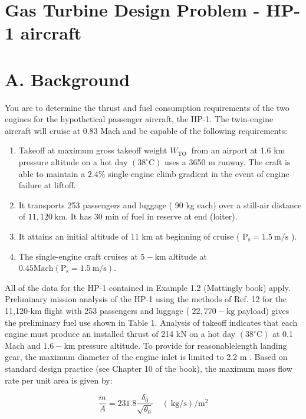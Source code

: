 \documentclass[10pt]{article}
\begin{document}
\section*{Gas Turbine Design Problem - HP-1 aircraft}
\section*{A. Background}
You are to determine the thrust and fuel consumption requirements of the two engines for the hypothetical passenger aircraft, the HP-1. The twin-engine aircraft will cruise at 0.83 Mach and be capable of the following requirements:

\begin{enumerate}
  \item Takeoff at maximum gross takeoff weight $W_{\text {TO }}$ from an airport at 1.6 km pressure altitude on a hot day $\left(38^{\circ} \mathrm{C}\right)$ uses a 3650 m runway. The craft is able to maintain a $2.4 \%$ single-engine climb gradient in the event of engine failure at liftoff.
  \item It transports 253 passengers and luggage ( 90 kg each) over a still-air distance of $11,120 \mathrm{~km}$. It has 30 min of fuel in reserve at end (loiter).
  \item It attains an initial altitude of 11 km at beginning of cruise ( $\mathrm{P}_{\mathrm{s}}=1.5 \mathrm{~m} / \mathrm{s}$ ).
  \item The single-engine craft cruises at $5-\mathrm{km}$ altitude at $0.45 \mathrm{Mach}\left(\mathrm{P}_{\mathrm{s}}=1.5 \mathrm{~m} / \mathrm{s}\right)$.
\end{enumerate}

All of the data for the HP-1 contained in Example 1.2 (Mattingly book) apply. Preliminary mission analysis of the HP-1 using the methods of Ref. 12 for the 11,120-km flight with 253 passengers and luggage ( $22,770-\mathrm{kg}$ payload) gives the preliminary fuel use shown in Table 1. Analysis of takeoff indicates that each engine must produce an installed thrust of 214 kN on a hot day $\left(38^{\circ} \mathrm{C}\right)$ at 0.1 Mach and $1.6-\mathrm{km}$ pressure altitude. To provide for reasonablelength landing gear, the maximum diameter of the engine inlet is limited to 2.2 m . Based on standard design practice (see Chapter 10 of the book), the maximum mass flow rate per unit area is given by:

$$
\frac{\dot{m}}{A}=231.8 \frac{\delta_{0}}{\sqrt{\theta_{0}}} \quad(\mathrm{~kg} / \mathrm{s}) / \mathrm{m}^{2}
$$
\end{document}
